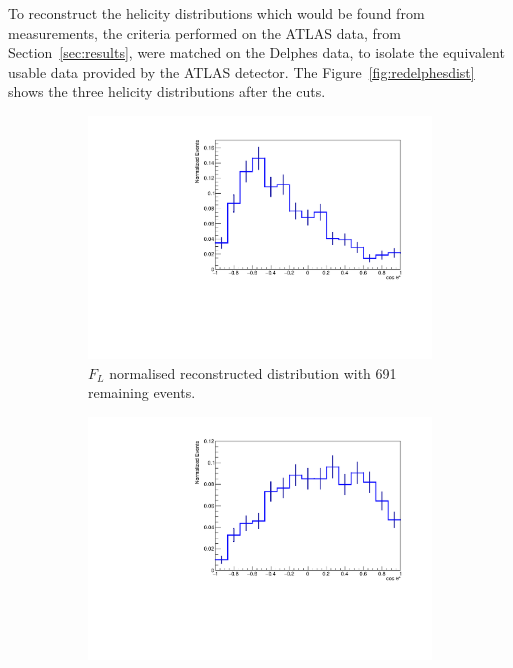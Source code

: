 \documentclass[12pt,a4paper]{article}
\numberwithin{equation}{section}
\begin{document}
To reconstruct the helicity distributions which would be found from
measurements, the criteria performed on the ATLAS data, from
Section~\ref{sec:results}, were matched on the Delphes data, to isolate the
equivalent usable data provided by the ATLAS detector. The
Figure~\ref{fig:redelphesdist} shows the three helicity distributions after the
cuts.
\begin{figure}[H]
  \centering
  \begin{subfigure}[t]{0.47\textwidth}
    \centering
    \includegraphics[width=1.2\textwidth]{figures/delphes_ctstarL}
    \caption{$F_L$ normalised reconstructed distribution with 691 remaining events.}
  \end{subfigure}\hfill{}%
  \begin{subfigure}[t]{0.47\textwidth}
    \centering
    \includegraphics[width=1.2\textwidth]{figures/delphes_ctstarR}

\end{subfigure}
\end{figure}
\end{document}
